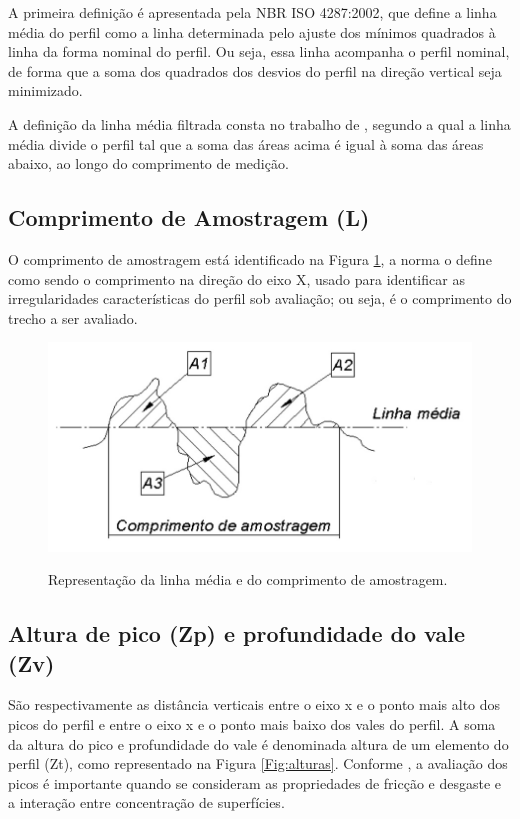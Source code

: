 A primeira definição é apresentada pela NBR ISO 4287:2002\nocite{iso4287}, que define a linha média do perfil como a linha determinada pelo ajuste dos mínimos quadrados à linha da forma nominal do perfil. Ou seja, essa linha acompanha o perfil nominal, de forma que a soma dos quadrados dos desvios do perfil na direção vertical seja minimizado.

A definição da linha média filtrada consta no trabalho de , segundo a qual a linha média divide o perfil tal que a soma das áreas acima é igual à soma das áreas abaixo, ao longo do comprimento de medição.

\subsection{Comprimento de Amostragem (L)}
O comprimento de amostragem está identificado na Figura \ref{Fig:lm_e_ca}, a norma o define como sendo o comprimento na direção do eixo X, usado para identificar as irregularidades características do perfil sob avaliação; ou seja, é o comprimento do trecho a ser avaliado.

\begin{figure}[!ht]
\centering
{\includegraphics[scale=0.50]{figures/lm_e_ca.jpg}}\\\caption{Representação da linha média e do comprimento de amostragem.}
 \label{Fig:lm_e_ca}
\end{figure}

\subsection{Altura de pico (Zp) e profundidade do vale (Zv)}
São respectivamente as distância verticais entre o eixo x e o ponto mais alto dos picos do perfil e entre o eixo x e o ponto mais baixo dos vales do perfil. A soma da altura do pico e profundidade do vale é denominada altura de um elemento do perfil (Zt), como representado na Figura \ref{Fig:alturas}.
 Conforme , a avaliação dos picos é importante quando se consideram as propriedades de fricção e desgaste e a interação entre concentração de superfícies.

